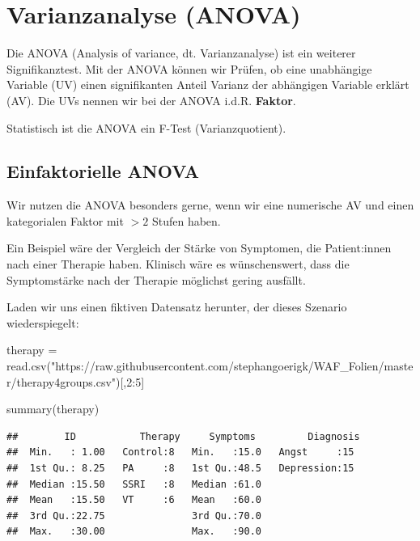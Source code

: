 \documentclass[
]{book}
\newenvironment{Shaded}{\begin{snugshade}}{\end{snugshade}}
\newcommand{\DecValTok}[1]{\textcolor[rgb]{0.00,0.00,0.81}{#1}}
\newcommand{\FunctionTok}[1]{\textcolor[rgb]{0.00,0.00,0.00}{#1}}
\newcommand{\NormalTok}[1]{#1}
\newcommand{\OtherTok}[1]{\textcolor[rgb]{0.56,0.35,0.01}{#1}}
\newcommand{\SpecialCharTok}[1]{\textcolor[rgb]{0.00,0.00,0.00}{#1}}
\newcommand{\StringTok}[1]{\textcolor[rgb]{0.31,0.60,0.02}{#1}}
\begin{document}
\hypertarget{varianzanalyse-anova}{%
\chapter{Varianzanalyse (ANOVA)}\label{varianzanalyse-anova}}

Die ANOVA (Analysis of variance, dt. Varianzanalyse) ist ein weiterer Signifikanztest. Mit der ANOVA können wir Prüfen, ob eine unabhängige Variable (UV) einen signifikanten Anteil Varianz der abhängigen Variable erklärt (AV). Die UVs nennen wir bei der ANOVA i.d.R. \textbf{Faktor}.

Statistisch ist die ANOVA ein F-Test (Varianzquotient).

\hypertarget{einfaktorielle-anova}{%
\section{Einfaktorielle ANOVA}\label{einfaktorielle-anova}}

Wir nutzen die ANOVA besonders gerne, wenn wir eine numerische AV und einen kategorialen Faktor mit \(>2\) Stufen haben.

Ein Beispiel wäre der Vergleich der Stärke von Symptomen, die Patient:innen nach einer Therapie haben. Klinisch wäre es wünschenswert, dass die Symptomstärke nach der Therapie möglichst gering ausfällt.

Laden wir uns einen fiktiven Datensatz herunter, der dieses Szenario wiederspiegelt:

\begin{Shaded}
\begin{Highlighting}[]
\NormalTok{therapy }\OtherTok{=} \FunctionTok{read.csv}\NormalTok{(}\StringTok{"https://raw.githubusercontent.com/stephangoerigk/WAF\_Folien/master/therapy4groups.csv"}\NormalTok{)[,}\DecValTok{2}\SpecialCharTok{:}\DecValTok{5}\NormalTok{]}

\FunctionTok{summary}\NormalTok{(therapy)}
\end{Highlighting}
\end{Shaded}

\begin{verbatim}
##        ID           Therapy     Symptoms         Diagnosis 
##  Min.   : 1.00   Control:8   Min.   :15.0   Angst     :15  
##  1st Qu.: 8.25   PA     :8   1st Qu.:48.5   Depression:15  
##  Median :15.50   SSRI   :8   Median :61.0                  
##  Mean   :15.50   VT     :6   Mean   :60.0                  
##  3rd Qu.:22.75               3rd Qu.:70.0                  
##  Max.   :30.00               Max.   :90.0
\end{verbatim}
\end{document}
